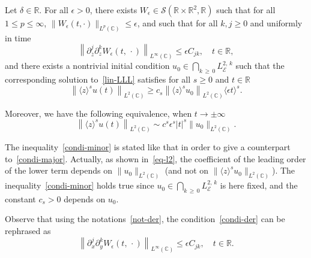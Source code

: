\documentclass[AHL,Unicode,published]{cedram}
\newcommand{\C}{\mathbb{C}}
\newcommand{\R}{\mathbb{R}}
\newcommand{\E}{\mathcal{E}}
\newcommand{\crS}{\mathscr{S}}
\newcommand*\eps{\epsilon}
\newcommand{\ov}{\overline}
\newcommand{\<}{\langle}
\renewcommand{\>}{\rangle}
\newcommand{\R}{\mathbb{R}}
\begin{document}
\begin{theo} \label{thm2.3}
Let $\delta \in \R$. For all $\eps>0$, there exists $W_\eps \in \crS(\R \times \R^2, \R)$ such that for all $1 \leq p \leq \infty$, $\|W_\eps(t,\cdot)\|_{L^p(\C)}\leq \eps$, and such that for all $k,j\geq 0$ and uniformly in time
\begin{equation}\label{condi-der}
\left\|\partial^j_{\ov z } \partial^k_z W_\eps(t,\,\cdot)\right\|_{L^{\infty}(\C)}\leq \eps C_{jk}, \quad t\in \R,
\end{equation}
and there exists a nontrivial initial condition $ u_0 \in \bigcap_{k\,\geq\,0} L^{2,\,k}_\E$ such that the corresponding solution to~\eqref{lin-LLL} satisfies for all $s \geq 0$ and $t\in \R$
\begin{equation}\label{condi-minor}
\left\|\<z\>^s u(t)\right\|_{L^{2}(\C)} \geq c_s \left\|\<z\>^s u_0\right\|_{L^{2}(\C)}\<\eps t\>^{s}.
\end{equation}

Moreover, we have the following equivalence, when $ t\longrightarrow \pm
\infty$
\begin{equation}\label{eq-l2}
\left\|\<z\>^s u(t)\right\|_{L^{2}(\C)} \sim c^s \eps^s |t|^s \|u_0\|_{L^{2}(\C)}.
\end{equation}
\end{theo}

The inequality~\eqref{condi-minor} is stated like that in order to give a counterpart to~\eqref{condi-major}. Actually, as shown in~\eqref{eq-l2}, the coefficient of the leading order of the lower term depends on $\|u_0\|_{L^{2}(\C)}$ (and not on $ \|\<z\>^s u_0\|_{L^{2}(\C)}$). The inequality~\eqref{condi-minor} holds true since $u_0 \in \bigcap_{k\,\geq\, 0} L^{2,\,k}_\E$ is here fixed, and the constant $c_s>0$ depends on $u_0$.

Observe that using the notations~\eqref{not-der}, the condition~\eqref{condi-der} can be rephrased as
\[
\left\|\partial^j_{x} \partial^k_y W_\eps(t,\,\cdot)\right\|_{L^{\infty}(\C)}\leq
\eps C_{jk}, \quad t\in \R.
\]
\end{document}

